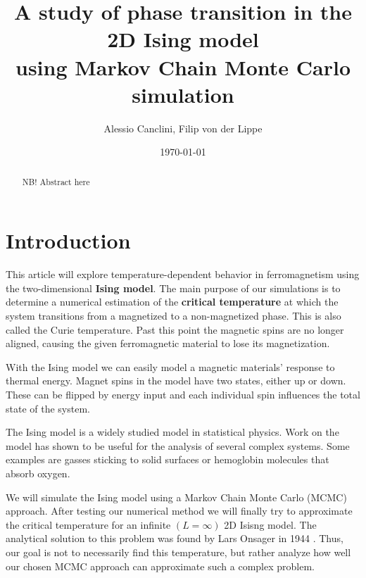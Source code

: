 \documentclass[english,notitlepage,reprint,nofootinbib]{revtex4-1}  %
\begin{document}
\title{A study of phase transition in the 2D Ising model\\using Markov Chain Monte Carlo simulation}  %
\author{Alessio Canclini, Filip von der Lippe} %
\date{\today}                             %
\noaffiliation                            %

\begin{abstract}
    NB! Abstract here
\end{abstract}
\maketitle


\section{Introduction}\label{sec:intro}
This article will explore temperature-dependent behavior in ferromagnetism using the two-dimensional \textbf{Ising model}. The main purpose of our simulations is to determine a numerical estimation of the \textbf{critical temperature} at which the system transitions from a magnetized to a non-magnetized phase. This is also called the Curie temperature. Past this point the magnetic spins are no longer aligned, causing the given ferromagnetic material to lose its magnetization. 

With the Ising model we can easily model a magnetic materials' response to thermal energy. Magnet spins in the model have two states, either up or down. These can be flipped by energy input and each individual spin influences the total state of the system.

The Ising model is a widely studied model in statistical physics. Work on the model has shown to be useful for the analysis of several complex systems. Some examples are gasses sticking to solid surfaces or hemoglobin molecules that absorb oxygen.\cite{compendium}

We will simulate the Ising model using a Markov Chain Monte Carlo (MCMC) approach. After testing our numerical method we will finally try to approximate the critical temperature for an infinite $(L=\infty)$ 2D Isisng model. The analytical solution to this problem was found by Lars Onsager in 1944 \cite{project}. Thus, our goal is not to necessarily find this temperature, but rather analyze how well our chosen MCMC approach can approximate such a complex problem.
\end{document}
